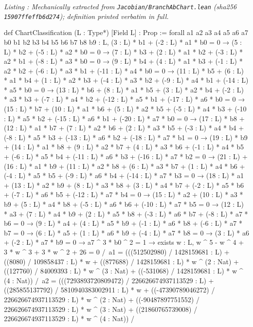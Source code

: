 \documentclass[a4paper,11pt]{article}
\newcounter{leanlisting}
\newenvironment{leanlisting}[2]{%
  \refstepcounter{leanlisting}\label{#2}%
  \begin{center}\textit{\small\color{inksecondary}Listing \theleanlisting: #1}\end{center}%
  \Verbatim[breaklines=true,breakanywhere=true,fontsize=\footnotesize,frame=single,framesep=4pt,rulecolor=\color{borderstrong},fillcolor=\color{bgsubtle}]%
}{%
  \endVerbatim%
}
\theoremstyle{jsplain}
\theoremstyle{jsdef}
\theoremstyle{jsrem}
\begin{document}
\begin{leanlisting}{Mechanically extracted from \texttt{Jacobian/BranchAbChart.lean} (sha256 \texttt{15907ffeffb6d274}); definition printed verbatim in full.}{ab:lst:def-chartclass}
def ChartClassification (L : Type*) [Field L] : Prop :=
  forall a1 a2 a3 a4 a5 a6 a7 b0 b1 b2 b3 b4 b5 b6 b7 b8 b9 : L,
    (3 : L) * b1 + (-2 : L) * a1 * b0 = 0 →
    (5 : L) * b2 + (-5 : L) * a2 * b0 = 0 →
    (7 : L) * b3 + (2 : L) * a1 * b2 + (-3 : L) * a2 * b1 + (-8 : L) * a3 * b0 = 0 →
    (9 : L) * b4 + (4 : L) * a1 * b3 + (-1 : L) * a2 * b2 + (-6 : L) * a3 * b1 + (-11 : L) * a4 * b0 = 0 →
    (11 : L) * b5 + (6 : L) * a1 * b4 + (1 : L) * a2 * b3 + (-4 : L) * a3 * b2 + (-9 : L) * a4 * b1 + (-14 : L) * a5 * b0 = 0 →
    (13 : L) * b6 + (8 : L) * a1 * b5 + (3 : L) * a2 * b4 + (-2 : L) * a3 * b3 + (-7 : L) * a4 * b2 + (-12 : L) * a5 * b1 + (-17 : L) * a6 * b0 = 0 →
    (15 : L) * b7 + (10 : L) * a1 * b6 + (5 : L) * a2 * b5 + (-5 : L) * a4 * b3 + (-10 : L) * a5 * b2 + (-15 : L) * a6 * b1 + (-20 : L) * a7 * b0 = 0 →
    (17 : L) * b8 + (12 : L) * a1 * b7 + (7 : L) * a2 * b6 + (2 : L) * a3 * b5 + (-3 : L) * a4 * b4 + (-8 : L) * a5 * b3 + (-13 : L) * a6 * b2 + (-18 : L) * a7 * b1 = 0 →
    (19 : L) * b9 + (14 : L) * a1 * b8 + (9 : L) * a2 * b7 + (4 : L) * a3 * b6 + (-1 : L) * a4 * b5 + (-6 : L) * a5 * b4 + (-11 : L) * a6 * b3 + (-16 : L) * a7 * b2 = 0 →
    (21 : L) + (16 : L) * a1 * b9 + (11 : L) * a2 * b8 + (6 : L) * a3 * b7 + (1 : L) * a4 * b6 + (-4 : L) * a5 * b5 + (-9 : L) * a6 * b4 + (-14 : L) * a7 * b3 = 0 →
    (18 : L) * a1 + (13 : L) * a2 * b9 + (8 : L) * a3 * b8 + (3 : L) * a4 * b7 + (-2 : L) * a5 * b6 + (-7 : L) * a6 * b5 + (-12 : L) * a7 * b4 = 0 →
    (15 : L) * a2 + (10 : L) * a3 * b9 + (5 : L) * a4 * b8 + (-5 : L) * a6 * b6 + (-10 : L) * a7 * b5 = 0 →
    (12 : L) * a3 + (7 : L) * a4 * b9 + (2 : L) * a5 * b8 + (-3 : L) * a6 * b7 + (-8 : L) * a7 * b6 = 0 →
    (9 : L) * a4 + (4 : L) * a5 * b9 + (-1 : L) * a6 * b8 + (-6 : L) * a7 * b7 = 0 →
    (6 : L) * a5 + (1 : L) * a6 * b9 + (-4 : L) * a7 * b8 = 0 →
    (3 : L) * a6 + (-2 : L) * a7 * b9 = 0 →
    a7 ^ 3 * b0 ^ 2 = 1 →
    exists w : L, w ^ 5 - w ^ 4 + 3 * w ^ 3 + 3 * w ^ 2 + 26 = 0 /\
      a1 = (((512502980) / 1428159681 : L) + ((8080) / 109858437 : L) * w + ((877688) / 1428159681 : L) * w ^ (2 : Nat) + ((127760) / 84009393 : L) * w ^ (3 : Nat) + ((-531068) / 1428159681 : L) * w ^ (4 : Nat)) /\
      a2 = (((7293893720809472) / 226626674937113529 : L) + ((285855137792) / 5810940383002911 : L) * w + ((-47390789046272) / 226626674937113529 : L) * w ^ (2 : Nat) + ((-90487897751552) / 226626674937113529 : L) * w ^ (3 : Nat) + ((21860765739008) / 226626674937113529 : L) * w ^ (4 : Nat)) /\

\end{leanlisting}
\end{document}
